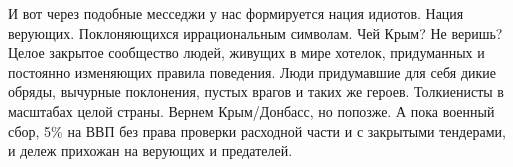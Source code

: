 И вот через подобные месседжи у нас формируется нация идиотов. Нация верующих.
Поклоняющихся иррациональным символам. Чей Крым? Не веришь? Целое закрытое
сообщество людей, живущих в мире хотелок, придуманных и постоянно изменяющих
правила поведения. Люди придумавшие для себя дикие обряды, вычурные поклонения,
пустых врагов и таких же героев. Толкиенисты в масштабах целой страны. Вернем
Крым/Донбасс, но попозже. А пока военный сбор, 5\% на ВВП без права проверки
расходной части и с закрытыми тендерами, и дележ прихожан на верующих и
предателей.

